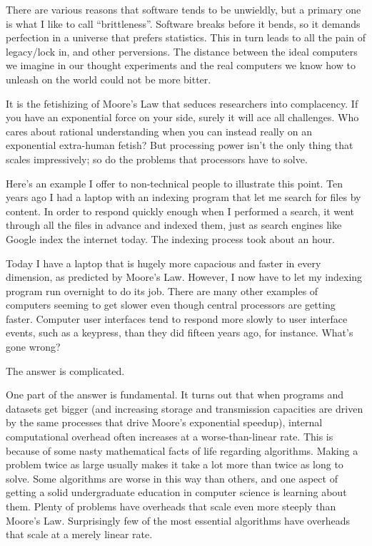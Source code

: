 \documentclass[letterpaper,12pt,english]{sphinxmanual}
\begin{document}
There are various reasons that software tends to be unwieldly, but a primary one is what I like to call ``brittleness''. Software breaks before it bends, so it demands perfection in a universe that prefers statistics. This in turn leads to all the pain of legacy/lock in, and other perversions. The distance between the ideal computers we imagine in our thought experiments and the real computers we know how to unleash on the world could not be more bitter.

It is the fetishizing of Moore's Law that seduces researchers into complacency. If you have an exponential force on your side, surely it will ace all challenges. Who cares about rational understanding when you can instead really on an exponential extra-human fetish? But processing power isn't the only thing that scales impressively; so do the problems that processors have to solve.

Here's an example I offer to non-technical people to illustrate this point. Ten years ago I had a laptop with an indexing program that let me search for files by content. In order to respond quickly enough when I performed a search, it went through all the files in advance and indexed them, just as search engines like Google index the internet today. The indexing process took about an hour.

Today I have a laptop that is hugely more capacious and faster in every dimension, as predicted by Moore's Law. However, I now have to let my indexing program run overnight to do its job. There are many other examples of computers seeming to get slower even though central processors are getting faster. Computer user interfaces tend to respond more slowly to user interface events, such as a keypress, than they did fifteen years ago, for instance. What's gone wrong?

The answer is complicated.

One part of the answer is fundamental. It turns out that when programs and datasets get bigger (and increasing storage and transmission capacities are driven by the same processes that drive Moore's exponential speedup), internal computational overhead often increases at a worse-than-linear rate. This is because of some nasty mathematical facts of life regarding algorithms. Making a problem twice as large usually makes it take a lot more than twice as long to solve. Some algorithms are worse in this way than others, and one aspect of getting a solid undergraduate education in computer science is learning about them. Plenty of problems have overheads that scale even more steeply than Moore's Law. Surprisingly few of the most essential algorithms have overheads that scale at a merely linear rate.
\end{document}
